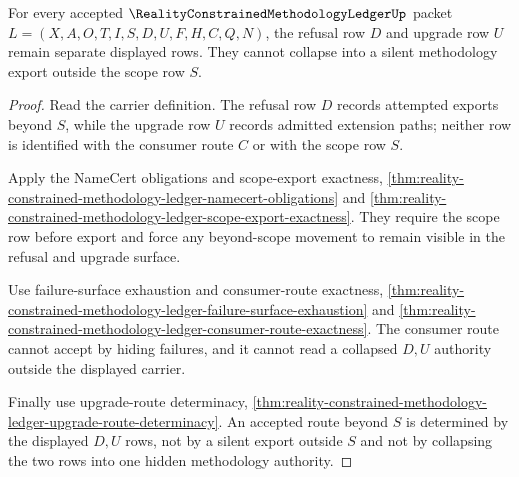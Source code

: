 \begin{theorem}
\label{thm:reality-constrained-methodology-ledger-refusal-upgrade-noncollapse}
For every accepted $\RealityConstrainedMethodologyLedgerUp$ packet
$L=(X,A,O,T,I,S,D,U,F,H,C,Q,N)$, the refusal row $D$ and upgrade row $U$ remain
separate displayed rows. They cannot collapse into a silent methodology export
outside the scope row $S$.
\end{theorem}
\begin{proof}
Read the carrier definition. The refusal row $D$ records attempted exports
beyond $S$, while the upgrade row $U$ records admitted extension paths; neither
row is identified with the consumer route $C$ or with the scope row $S$.

Apply the NameCert obligations and scope-export exactness,
\autoref{thm:reality-constrained-methodology-ledger-namecert-obligations} and
\autoref{thm:reality-constrained-methodology-ledger-scope-export-exactness}.
They require the scope row before export and force any beyond-scope movement to
remain visible in the refusal and upgrade surface.

Use failure-surface exhaustion and consumer-route exactness,
\autoref{thm:reality-constrained-methodology-ledger-failure-surface-exhaustion}
and
\autoref{thm:reality-constrained-methodology-ledger-consumer-route-exactness}.
The consumer route cannot accept by hiding failures, and it cannot read a
collapsed $D,U$ authority outside the displayed carrier.

Finally use upgrade-route determinacy,
\autoref{thm:reality-constrained-methodology-ledger-upgrade-route-determinacy}.
An accepted route beyond $S$ is determined by the displayed $D,U$ rows, not by a
silent export outside $S$ and not by collapsing the two rows into one hidden
methodology authority.
\end{proof}

